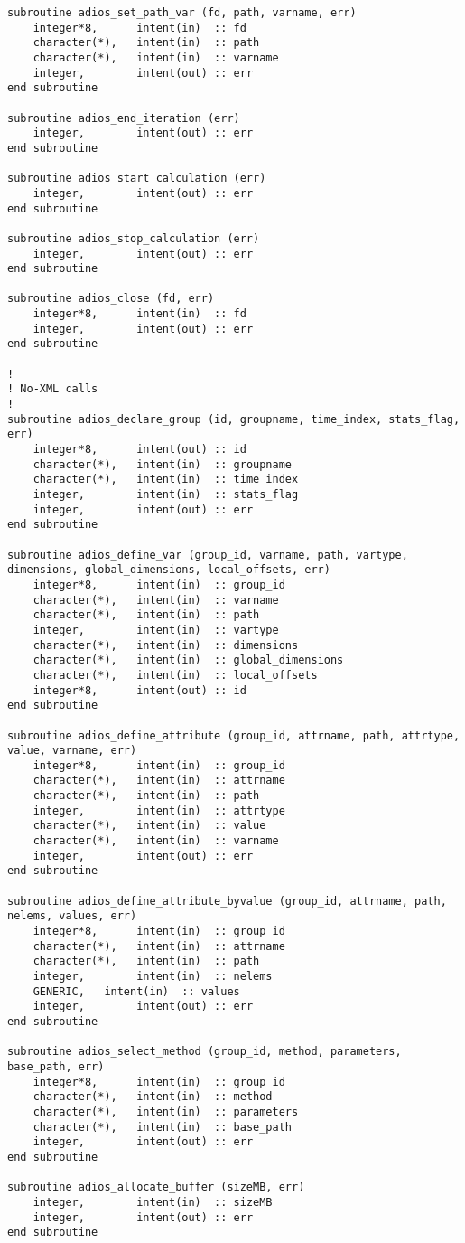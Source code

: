 \begin{lstlisting}[language=ADIOS,alsolanguage=Fortran]
subroutine adios_set_path_var (fd, path, varname, err)
    integer*8,      intent(in)  :: fd
    character(*),   intent(in)  :: path
    character(*),   intent(in)  :: varname
    integer,        intent(out) :: err
end subroutine

subroutine adios_end_iteration (err)
    integer,        intent(out) :: err
end subroutine

subroutine adios_start_calculation (err)
    integer,        intent(out) :: err
end subroutine

subroutine adios_stop_calculation (err)
    integer,        intent(out) :: err
end subroutine

subroutine adios_close (fd, err)
    integer*8,      intent(in)  :: fd
    integer,        intent(out) :: err
end subroutine

!
! No-XML calls
!
subroutine adios_declare_group (id, groupname, time_index, stats_flag, err)
    integer*8,      intent(out) :: id
    character(*),   intent(in)  :: groupname
    character(*),   intent(in)  :: time_index
    integer,        intent(in)  :: stats_flag
    integer,        intent(out) :: err
end subroutine

subroutine adios_define_var (group_id, varname, path, vartype, dimensions, global_dimensions, local_offsets, err)
    integer*8,      intent(in)  :: group_id
    character(*),   intent(in)  :: varname
    character(*),   intent(in)  :: path
    integer,        intent(in)  :: vartype
    character(*),   intent(in)  :: dimensions
    character(*),   intent(in)  :: global_dimensions
    character(*),   intent(in)  :: local_offsets
    integer*8,      intent(out) :: id
end subroutine

subroutine adios_define_attribute (group_id, attrname, path, attrtype, value, varname, err)
    integer*8,      intent(in)  :: group_id
    character(*),   intent(in)  :: attrname
    character(*),   intent(in)  :: path
    integer,        intent(in)  :: attrtype
    character(*),   intent(in)  :: value
    character(*),   intent(in)  :: varname
    integer,        intent(out) :: err
end subroutine

subroutine adios_define_attribute_byvalue (group_id, attrname, path, nelems, values, err)
    integer*8,      intent(in)  :: group_id
    character(*),   intent(in)  :: attrname
    character(*),   intent(in)  :: path
    integer,        intent(in)  :: nelems
    GENERIC,   intent(in)  :: values
    integer,        intent(out) :: err
end subroutine

subroutine adios_select_method (group_id, method, parameters, base_path, err)
    integer*8,      intent(in)  :: group_id
    character(*),   intent(in)  :: method
    character(*),   intent(in)  :: parameters
    character(*),   intent(in)  :: base_path
    integer,        intent(out) :: err
end subroutine

subroutine adios_allocate_buffer (sizeMB, err)
    integer,        intent(in)  :: sizeMB
    integer,        intent(out) :: err
end subroutine
\end{lstlisting}

